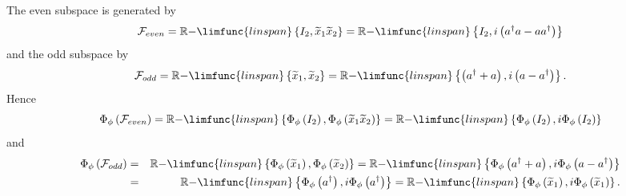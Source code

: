 \documentclass[aps,preprint]{revtex4}
\begin{document}
The even subspace is generated by 
\begin{equation}
\mathcal{F}_{even}=\mathbb{R-}\limfunc{linspan}\left\{ I_{2},\widetilde{x}%
_{1}\widetilde{x}_{2}\right\} =\mathbb{R-}\limfunc{linspan}\left\{
I_{2},i\left( a^{\dagger }a-aa^{\dagger }\right) \right\}
\end{equation}%
and the odd subspace by 
\begin{equation}
\mathcal{F}_{odd}=\mathbb{R-}\limfunc{linspan}\left\{ \widetilde{x}_{1},%
\widetilde{x}_{2}\right\} =\mathbb{R-}\limfunc{linspan}\left\{ \left(
a^{\dagger }+a\right) ,i\left( a-a^{\dagger }\right) \right\} .
\end{equation}%
Hence 
\begin{equation}
\Phi _{\phi }\left( \mathcal{F}_{even}\right) =\mathbb{R-}\limfunc{linspan}%
\left\{ \Phi _{\phi }\left( I_{2}\right) ,\Phi _{\phi }\left( \widetilde{x}%
_{1}\widetilde{x}_{2}\right) \right\} =\mathbb{R-}\limfunc{linspan}\left\{
\Phi _{\phi }\left( I_{2}\right) ,i\Phi _{\phi }\left( I_{2}\right) \right\}
\end{equation}%
and 
\begin{eqnarray}
\Phi _{\phi }\left( \mathcal{F}_{odd}\right) &=&\mathbb{R-}\limfunc{linspan}%
\left\{ \Phi _{\phi }\left( \widetilde{x}_{1}\right) ,\Phi _{\phi }\left( 
\widetilde{x}_{2}\right) \right\} =\mathbb{R-}\limfunc{linspan}\left\{ \Phi
_{\phi }\left( a^{\dagger }+a\right) ,i\Phi _{\phi }\left( a-a^{\dagger
}\right) \right\} \\
&=&\mathbb{R-}\limfunc{linspan}\left\{ \Phi _{\phi }\left( a^{\dagger
}\right) ,i\Phi _{\phi }\left( a^{\dagger }\right) \right\} =\mathbb{R-}%
\limfunc{linspan}\left\{ \Phi _{\phi }\left( \widetilde{x}_{1}\right) ,i\Phi
_{\phi }\left( \widetilde{x}_{1}\right) \right\} .
\end{eqnarray}
\end{document}
